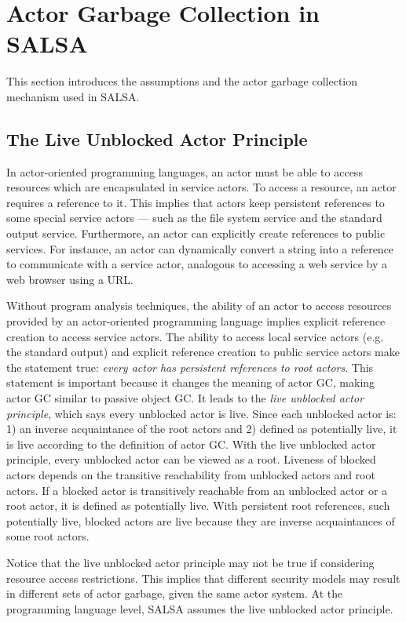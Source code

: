 \section{Actor Garbage Collection in SALSA}
This section introduces the assumptions and the actor garbage collection mechanism used in SALSA.

\subsection{The Live Unblocked Actor Principle} \label{The Live Unblocked Actor Principle}
In actor-oriented programming languages, an actor must be able to access 
resources which are encapsulated in service actors. To access a resource, an actor
requires a reference to it. This implies that actors keep persistent references to
some special service actors --- such as the file system service and the standard
output service. Furthermore, an actor can explicitly create references to public
services. For instance, an actor can dynamically convert a string into a reference to
communicate with a service actor, analogous to accessing a web service by a web
browser using a URL.

Without program analysis techniques,
the ability of an actor to access resources provided by 
an actor-oriented programming language implies 
explicit reference creation to access service actors. The
ability to access local service actors (e.g. the standard output) and explicit 
reference creation to public service actors make the statement true: \emph{every
actor has persistent references to root actors}. This statement is important
 because it changes the meaning of actor GC, making actor GC similar to passive
object GC. It leads to the \emph{live unblocked actor principle}, 
which says every unblocked actor is live. Since
each unblocked actor is: 1) an inverse acquaintance of the root actors and 2)
defined as potentially live, it is live according to the definition of actor GC.
With the live unblocked actor principle, every unblocked actor can be viewed
as a root. Liveness of blocked actors depends on the transitive reachability from
unblocked actors and root actors. If a blocked actor is transitively reachable
from an unblocked actor or a root actor, it is defined as potentially live. With
persistent root references, such potentially live, blocked actors are live because
they are inverse acquaintances of some root actors.

Notice that the live unblocked actor principle may not be true 
if considering resource access restrictions. This implies that
different security models may result in different sets of actor garbage,
given the same actor system.
At the programming language level, SALSA assumes the live unblocked actor principle.  


